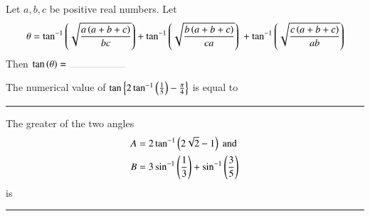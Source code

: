 \iffalse
\title{Assignment}
\author{Arjun Pavanje}
\section{fitb}
\fi
\item Let $a,b,c$ be positive real numbers. Let
\begin{multline*}
\theta=\tan ^{-1}\left(\sqrt{\frac{a\left(a+b+c\right)}{bc}}\right) + \tan ^{-1}\left(\sqrt{\frac{b\left(a+b+c\right)}{ca}}\right)\ + \tan ^{-1}\left(\sqrt{\frac{c\left(a+b+c\right)}{ab}}\right) 
\end{multline*}
Then $\tan \brak{\theta}= \rule{2cm}{0.1pt}$ 
\hfill {}
\item The numerical value of $\tan \left\{ 2\tan ^{-1}\left(\frac{1}{5}\right)-\frac{\pi}{4}\right\}$ is equal to \rule{2cm}{0.1pt}
\hfill {}
\item The greater of the two angles 
\begin{align*}
A &= 2 \tan ^{-1}\left(2\sqrt{2}-1\right) \text{ and}\\
B &= 3\sin ^{-1}\left(\frac{1}{3}\right) + \sin ^{-1}\left(\frac{3}{5}\right)
\end{align*}
is \rule{2cm}{0.1pt}
\hfill {}

